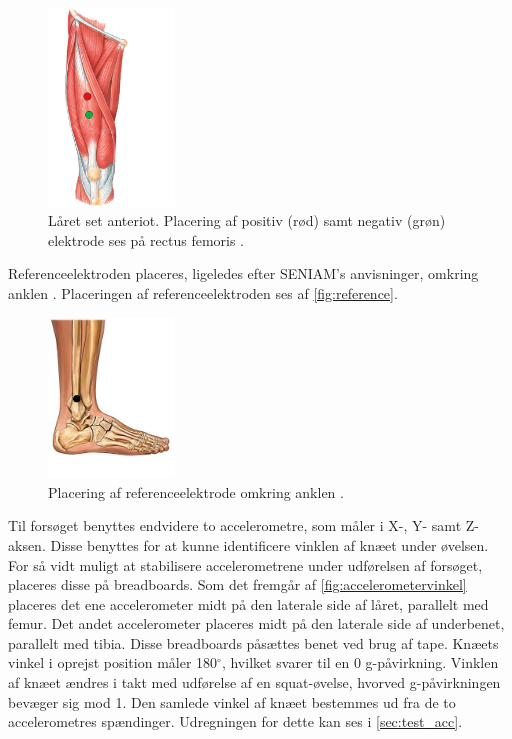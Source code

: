 \begin{figure}[H]
\centering
\includegraphics[width=0.3\textwidth]{figures/laarmuskel.png}
\caption{Låret set anteriot. Placering af positiv (rød) samt negativ (grøn) elektrode ses på rectus femoris \citep{martini2012}.}
\label{fig:laarmuskler}
\end{figure}

\noindent
Referenceelektroden placeres, ligeledes efter SENIAM's anvisninger, omkring anklen \citep{seniam2016}. Placeringen af referenceelektroden ses af \autoref{fig:reference}.

\begin{figure}[H]
\centering
\includegraphics[width=0.3\textwidth]{figures/reference}
\caption{Placering af referenceelektrode omkring anklen \citep{ankle2016}.}
\label{fig:reference}
\end{figure}

\noindent
Til forsøget benyttes endvidere to accelerometre, som måler i X-, Y- samt Z-aksen. Disse benyttes for at kunne identificere vinklen af knæet under øvelsen. For så vidt muligt at stabilisere accelerometrene under udførelsen af forsøget, placeres disse på breadboards. 
Som det fremgår af \autoref{fig:accelerometervinkel} placeres det ene accelerometer midt på den laterale side af låret, parallelt med femur. Det andet accelerometer placeres midt på den laterale side af underbenet, parallelt med tibia. Disse breadboards påsættes benet ved brug af tape. Knæets vinkel i oprejst position måler 180$^{\circ}$, hvilket svarer til en 0 g-påvirkning. Vinklen af knæet ændres i takt med udførelse af en squat-øvelse, hvorved g-påvirkningen bevæger sig mod 1. Den samlede vinkel af knæet bestemmes ud fra de to accelerometres spændinger. Udregningen for dette kan ses i \autoref{sec:test_acc}.

